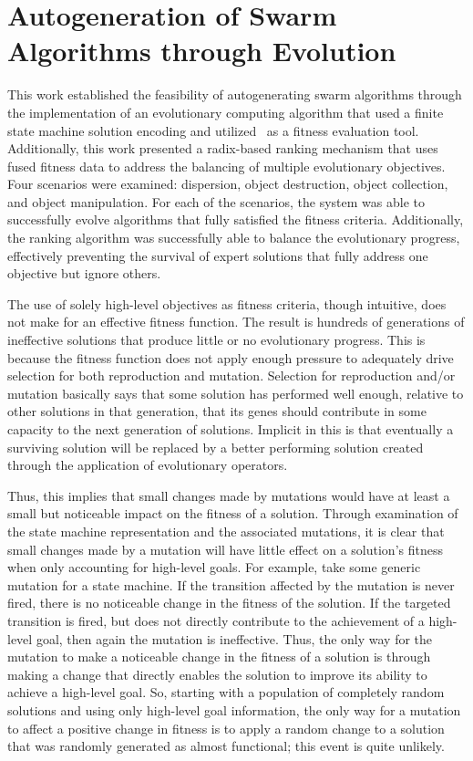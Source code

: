 \section{Autogeneration of Swarm Algorithms through Evolution}

This work established the feasibility of autogenerating swarm algorithms through the implementation of an evolutionary computing algorithm that used a finite state machine solution encoding and utilized \SWEEP{}\ as a fitness evaluation tool.  Additionally, this work presented a radix-based ranking mechanism that uses fused fitness data to address the balancing of multiple evolutionary objectives.  Four scenarios were examined: dispersion, object destruction, object collection, and object manipulation.  For each of the scenarios, the system was able to successfully evolve algorithms that fully satisfied the fitness criteria.  Additionally, the ranking algorithm was successfully able to balance the evolutionary progress, effectively preventing the survival of expert solutions that fully address one objective but ignore others. 

The use of solely high-level objectives as fitness criteria, though intuitive, does not make for an effective fitness function.  The result is hundreds of generations of ineffective solutions that produce little or no evolutionary progress.  This is because the fitness function does not apply enough pressure to adequately drive selection for both reproduction and mutation.  Selection for reproduction and/or mutation basically says that some solution has performed well enough, relative to other solutions in that generation, that its genes should contribute in some capacity to the next generation of solutions.  Implicit in this is that eventually a surviving solution will be replaced by a better performing solution created through the application of evolutionary operators.  

Thus, this implies that small changes made by mutations would have at least a small but noticeable impact on the fitness of a solution.  Through examination of the state machine representation and the associated mutations, it is clear that small changes made by a mutation will have little effect on a solution's fitness when only accounting for high-level goals.  For example, take some generic mutation for a state machine.  If the transition affected by the mutation is never fired, there is no noticeable change in the fitness of the solution.  If the targeted transition is fired, but does not directly contribute to the achievement of a high-level goal, then again the mutation is ineffective.  Thus, the only way for the mutation to make a noticeable change in the fitness of a solution is through making a change that directly enables the solution to improve its ability to achieve a high-level goal.  So, starting with a population of completely random solutions and using only high-level goal information, the only way for a mutation to affect a positive change in fitness is to apply a random change to a solution that was randomly generated as almost functional; this event is quite unlikely.

